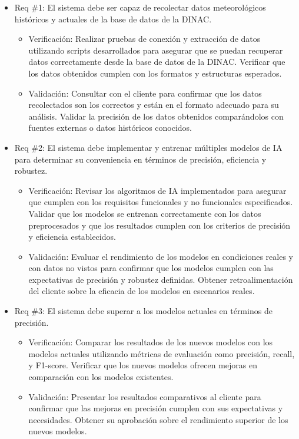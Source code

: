 \documentclass[
11pt, %
codirector, %
]{charter}
\begin{document}
\begin{itemize} 
\item Req \#1: El sistema debe ser capaz de recolectar datos meteorológicos históricos y actuales de la base de datos de la DINAC.

\begin{itemize}
	\item Verificación: Realizar pruebas de conexión y extracción de datos utilizando scripts desarrollados para asegurar que se puedan recuperar datos correctamente desde la base de datos de la DINAC. Verificar que los datos obtenidos cumplen con los formatos y estructuras esperados.
	\item Validación: Consultar con el cliente para confirmar que los datos recolectados son los correctos y están en el formato adecuado para su análisis. Validar la precisión de los datos obtenidos comparándolos con fuentes externas o datos históricos conocidos.
\end{itemize}

\item Req \#2: El sistema debe implementar y entrenar múltiples modelos de IA para determinar su conveniencia en términos de precisión, eficiencia y robustez.

\begin{itemize}
	\item Verificación: Revisar los algoritmos de IA implementados para asegurar que cumplen con los requisitos funcionales y no funcionales especificados. Validar que los modelos se entrenan correctamente con los datos preprocesados y que los resultados cumplen con los criterios de precisión y eficiencia establecidos.
	\item Validación: Evaluar el rendimiento de los modelos en condiciones reales y con datos no vistos para confirmar que los modelos cumplen con las expectativas de precisión y robustez definidas. Obtener retroalimentación del cliente sobre la eficacia de los modelos en escenarios reales.
\end{itemize}

\item Req \#3: El sistema debe superar a los modelos actuales en términos de precisión.

\begin{itemize}
	\item Verificación: Comparar los resultados de los nuevos modelos con los modelos actuales utilizando métricas de evaluación como precisión, recall, y F1-score. Verificar que los nuevos modelos ofrecen mejoras en comparación con los modelos existentes.
	\item Validación: Presentar los resultados comparativos al cliente para confirmar que las mejoras en precisión cumplen con sus expectativas y necesidades. Obtener su aprobación sobre el rendimiento superior de los nuevos modelos.
\end{itemize}


\end{itemize}
\end{document}
